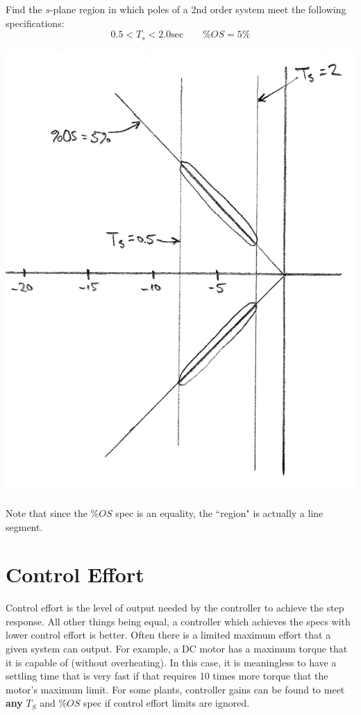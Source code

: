 \begin{ExampleSmall}
Find the $s$-plane region in which poles of a 2nd order system meet the following specifications:
\[
0.5 < T_s < 2.0 \mathrm{sec} \qquad \%OS = 5\%
\]

\includegraphics[width=3.in]{figs09/00791a.png}

Note that since the $\%OS$ spec is an equality, the ``region" is actually a line segment. 

\end{ExampleSmall}






\section{Control Effort}\label{CtlEff}


Control effort is the level of output needed by the controller to achieve the step response.  
All other things being equal, a controller which achieves the specs with lower control effort is better.  
Often there is a limited maximum effort that a given system can output.  
For example, a DC motor has a maximum torque that it is capable of (without overheating). 
In this case, it is meaningless to have 
a settling time that is very fast if that requires 10 times more torque that the motor's maximum limit.  
For some plants, controller gains can be found to meet {\bf any} $T_S$ and $\%OS$ spec if control 
effort limits are ignored. 

